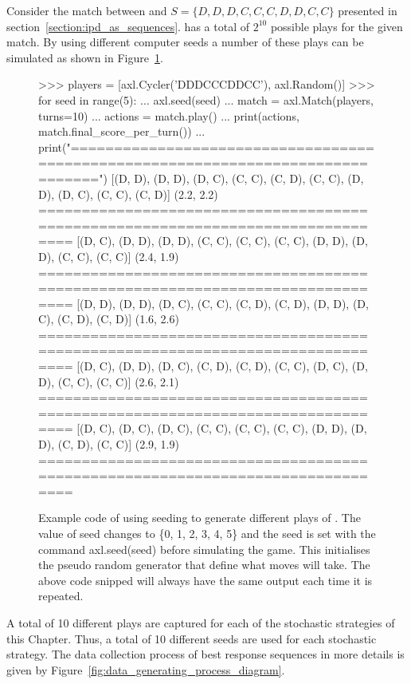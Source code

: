 Consider the match between \Random and \(S = \{D, D, D, C, C, C, D, D, C, C\}\)
presented in section~\ref{section:ipd_as_sequences}. \Random has a total of
\(2^{10}\) possible plays for the given match. By using different computer seeds a number of these
plays can be simulated as shown in Figure~\ref{fig:random_apl_example}.

\begin{figure}[!htbp]
    \begin{usagepy}
>>> players = [axl.Cycler('DDDCCCDDCC'), axl.Random()]
>>> for seed in range(5):
...   axl.seed(seed)
...   match = axl.Match(players, turns=10)
...   actions = match.play()
...   print(actions, match.final_score_per_turn())
...   print("================================================================================")
[(D, D), (D, D), (D, C), (C, C), (C, D), (C, C), (D, D), (D, C), (C, C), (C, D)] (2.2, 2.2)
================================================================================
[(D, C), (D, D), (D, D), (C, C), (C, C), (C, C), (D, D), (D, D), (C, C), (C, C)] (2.4, 1.9)
================================================================================
[(D, D), (D, D), (D, C), (C, C), (C, D), (C, D), (D, D), (D, C), (C, D), (C, D)] (1.6, 2.6)
================================================================================
[(D, C), (D, D), (D, C), (C, D), (C, D), (C, C), (D, C), (D, D), (C, C), (C, C)] (2.6, 2.1)
================================================================================
[(D, C), (D, C), (D, C), (C, C), (C, C), (C, C), (D, D), (D, D), (C, D), (C, C)] (2.9, 1.9)
================================================================================

\end{usagepy}
\caption{Example code of using seeding to generate different plays of \Random.
The value of seed changes to \{0, 1, 2, 3, 4, 5\} and the seed is set with
the command axl.seed(seed) before simulating the game. This initialises the
pseudo random generator that define what moves \Random will take.
The above code snipped will always have the same output each time it is
repeated.}\label{fig:random_apl_example}
\end{figure}

A total of 10 different plays are captured for each of the stochastic strategies
of this Chapter. Thus, a total of 10 different seeds are used for each stochastic
strategy.
The data collection process of best response sequences in more details is given
by Figure~\ref{fig:data_generating_process_diagram}.

